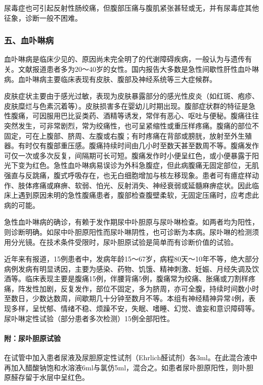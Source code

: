 尿毒症也可引起反射性肠绞痛，但腹部压痛与腹肌紧张甚轻或无，并有尿毒症其他征象，诊断一般不困难。

\subsubsection{五、血卟啉病}

血卟啉病是临床少见的、原因尚未完全明了的代谢障碍疾病，一般认为与遗传有关。文献报道患者多为20～40岁的女性。国内报告大多数是急性间歇性肝性血卟啉病。血卟啉病主要临床表现有皮肤、腹部及神经系统等三大症候群。

皮肤症状主要由于感光过敏，表现为皮肤暴露部分的感光性皮炎（如红斑、疱疹、皮肤糜烂与色素沉着等）。皮肤损害多在婴幼儿时期出现。腹部症状群的特征是急性腹痛，可因服用巴比妥类药、酒精等诱发，常伴有恶心、呕吐与便秘。腹痛往往突然发生，可非常剧烈，常为绞痛性，也可呈紧缩性或重压样疼痛。腹痛的部位不固定，可在上腹部、脐周、左腹或右腹；有时疼痛在背部或膀胱，放射至外生殖器。有时仅有腹部重压感。腹痛持续时间由几小时至数天甚至数周不等。腹痛发作可仅一次或多次反复，间隔期可长可短。腹痛发作时小便呈红色，或小便暴露于阳光下变为红色。急性血卟啉病易误诊为外科急腹症，但此病腹痛无固定部位，无肌强直与反跳痛，腹式呼吸存在，也无白细胞增加与核左移现象。患者可有癔症样动作、肢体疼痛或麻痹、软弱、怕光、反射消失、神经衰弱或延髓麻痹症状。因此临床上遇到原因未明的急性腹痛患者，腹部检查腹壁柔软，无固定压痛时，应考虑此病的可能。

急性血卟啉病的确诊，有赖于发作期尿中卟胆原与尿卟啉检查。如两者均为阳性，则诊断明确。如尿中卟胆原阳性而尿卟啉阴性，也可诊断为本病。尿卟啉的检测须用分光镜。在技术条件受限时，尿卟胆原试验是简单而有诊断价值的试验。

近年来有报道，15例患者中，发病年龄15～67岁，病程80天～10年不等，绝大部分病例发病有明显诱因，主要为感染、药物、饥饿、精神刺激、妊娠、月经失调及饮酒等。临床表现主要是腹痛15例，伴腰背痛5例，腹痛常为绞痛、胀痛或刀割样疼痛，阵发性加剧，反复发作，部位不固定，多为脐周，亦可全腹，持续时间数小时至数日，少数达数周，间歇期几十分钟至数月不等。本组有神经精神异常4例，表现多样，呈忧郁、情绪不稳、烦躁不安，失眠、嗜睡、幻觉、谵妄和意识障碍等。尿卟啉定性试验（部分患者多次检测）15例全部阳性。

\paragraph{附：尿卟胆原试验}

在试管中加入患者尿液及尿胆原定性试剂（Ehrlich醛试剂）各3ml。在此混合液中再加入醋酸钠饱和水溶液6ml与氯仿5ml，混合之。如患者尿卟胆原阳性，则卟胆原醛存留于水层中呈红色。

